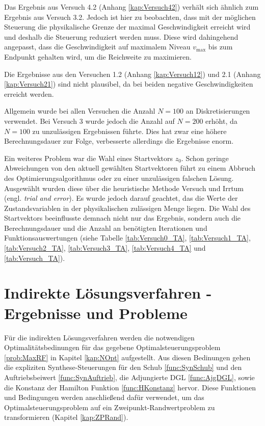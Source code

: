 Das Ergebnis aus Versuch 4.2 (Anhang \ref{kap:Versuch42}) verhält sich ähnlich zum Ergebnis aus Versuch 3.2. Jedoch ist hier zu beobachten, dass mit der möglichen Steuerung die physikalische Grenze der maximal Geschwindigkeit erreicht wird und deshalb die Steuerung reduziert werden muss. Diese wird dahingehend angepasst, dass die Geschwindigkeit auf maximalem Niveau $v_{\max}$ bis zum Endpunkt gehalten wird, um die Reichweite zu maximieren.

Die Ergebnisse aus den Versuchen 1.2 (Anhang \ref{kap:Versuch12}) und 2.1 (Anhang \ref{kap:Versuch21}) sind nicht plausibel, da bei beiden negative Geschwindigkeiten erreicht werden.

Allgemein wurde bei allen Versuchen die Anzahl $N = 100$ an Diskretisierungen verwendet. Bei Versuch 3 wurde jedoch die Anzahl auf $N = 200$ erhöht, da $N=100$ zu unzulässigen Ergebnissen führte. Dies hat zwar eine höhere Berechnungsdauer zur Folge, verbesserte allerdings die Ergebnisse enorm.

Ein weiteres Problem war die Wahl eines Startvektors $z_0$. Schon geringe Abweichungen von den aktuell gewählten Startvektoren führt zu einem Abbruch des Optimierungsalgorithmus oder zu einer unzulässigen falschen Lösung. Ausgewählt wurden diese über die heuristische Methode \glqq Versuch und Irrtum\grqq{} (engl. \textit{trial and error}). Es wurde jedoch darauf geachtet, das die Werte der Zustandsvariablen in der physikalischen zulässigen Menge liegen. Die Wahl des Startvektors beeinflusste demnach nicht nur das Ergebnis, sondern auch die Berechnungsdauer und die Anzahl an benötigten Iterationen und Funktionsauswertungen (siehe Tabelle \ref{tab:Versuch0_TA}, \ref{tab:Versuch1_TA}, \ref{tab:Versuch2_TA}, \ref{tab:Versuch3_TA}, \ref{tab:Versuch4_TA} und \ref{tab:Versuch_TA}).








\section{Indirekte Lösungsverfahren - Ergebnisse und Probleme}\label{kap:LSGIndirekt}
Für die indirekten Lösungsverfahren werden die notwendigen Optimalitätsbedinungen für das gegebene Optimalsteuerungsproblem \ref{prob:MaxRF} in Kapitel \ref{kap:NOpt} aufgestellt. Aus diesen Bedinungen gehen die expliziten Synthese-Steuerungen für den Schub \ref{func:SynSchub} und den Auftriebsbeiwert \ref{func:SynAuftrieb}, die Adjungierte DGL \ref{func:AjgDGL}, sowie die Konstanz der Hamilton Funktion \ref{func:HKonstanz} hervor. Diese Funktionen und Bedingungen werden anschließend dafür verwendet, um das Optimalsteuerungsproblem auf ein Zweipunkt-Randwertproblem zu transformieren (Kapitel \ref{kap:ZPRand}).

